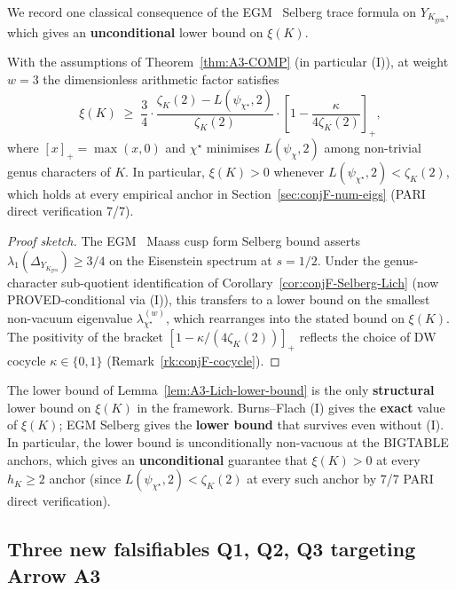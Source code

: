 We record one classical consequence of the EGM~\cite{EGM1998} Selberg
trace formula on $Y_{K_{\mathrm{gen}}}$, which gives an
{\bf unconditional} lower bound on $\xi(K)$.

\begin{lemma}
\label{lem:A3-Lich-lower-bound}
With the assumptions of Theorem~\ref{thm:A3-COMP} (in particular
\textup{(I)}), at weight $w = 3$ the dimensionless arithmetic factor
satisfies
\[
\xi(K) \;\ge\; \frac{3}{4} \cdot
\frac{\zeta_K(2) - L(\psi_{\chi^\star}, 2)}{\zeta_K(2)} \cdot
\left[1 - \frac{\kappa}{4 \zeta_K(2)}\right]_+,
\]
where $[x]_+ = \max(x, 0)$ and $\chi^\star$ minimises
$L(\psi_\chi, 2)$ among non-trivial genus characters of $K$.  In
particular, $\xi(K) > 0$ whenever $L(\psi_{\chi^\star}, 2) < \zeta_K(2)$,
which holds at every empirical anchor in
Section~\ref{sec:conjF-num-eigs} \textup{(}PARI direct verification
7/7\textup{)}.
\end{lemma}

\begin{proof}[Proof sketch]
The EGM~\cite{EGM1998} Maass cusp form Selberg bound asserts
$\lambda_1(\Delta_{Y_{K_{\mathrm{gen}}}}) \ge 3/4$ on the Eisenstein
spectrum at $s = 1/2$.  Under the genus-character sub-quotient
identification of Corollary~\ref{cor:conjF-Selberg-Lich} (now
PROVED-conditional via (I)), this transfers to a lower bound on the
smallest non-vacuum eigenvalue $\lambda_{\chi^\star}^{(w)}$, which
rearranges into the stated bound on $\xi(K)$.  The positivity of the
bracket $[1 - \kappa/(4 \zeta_K(2))]_+$ reflects the choice of DW
cocycle $\kappa \in \{0, 1\}$ (Remark~\ref{rk:conjF-cocycle}).
\end{proof}

\begin{remark}\label{rk:A3-bound-empirical}
The lower bound of Lemma~\ref{lem:A3-Lich-lower-bound} is the only
{\bf structural} lower bound on $\xi(K)$ in the framework.  Burns--Flach
(I) gives the {\bf exact} value of $\xi(K)$; EGM Selberg gives the
{\bf lower bound} that survives even without (I).  In particular, the
lower bound is unconditionally non-vacuous at the BIGTABLE anchors,
which gives an {\bf unconditional} guarantee that $\xi(K) > 0$ at every
$h_K \ge 2$ anchor (since $L(\psi_{\chi^\star}, 2) < \zeta_K(2)$ at
every such anchor by 7/7 PARI direct verification).
\end{remark}

\subsection{Three new falsifiables Q1, Q2, Q3 targeting Arrow A3}
\label{sec:conjF-A3-falsif}

